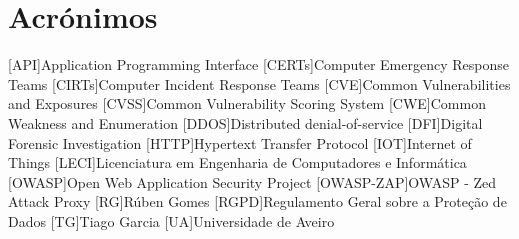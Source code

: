 \documentclass{report}
\begin{document}
\chapter*{Acrónimos}
\begin{acronym}
    [API]{Application Programming Interface}
    [CERTs]{Computer Emergency Response Teams}
    [CIRTs]{Computer Incident Response Teams}
    [CVE]{Common Vulnerabilities and Exposures}
    [CVSS]{Common Vulnerability Scoring System}
    [CWE]{Common Weakness and Enumeration}
    [DDOS]{Distributed denial-of-service}
    [DFI]{Digital Forensic Investigation}
    [HTTP]{Hypertext Transfer Protocol}
    [IOT]{Internet of Things}
    [LECI]{Licenciatura em Engenharia de Computadores e Informática}
    [OWASP]{Open Web Application Security Project}
    [OWASP-ZAP]{OWASP - Zed Attack Proxy}
    [RG]{Rúben Gomes}
    [RGPD]{Regulamento Geral sobre a Proteção de Dados}
    [TG]{Tiago Garcia}
    [UA]{Universidade de Aveiro}
\end{acronym}


\printbibliography
\end{document}
